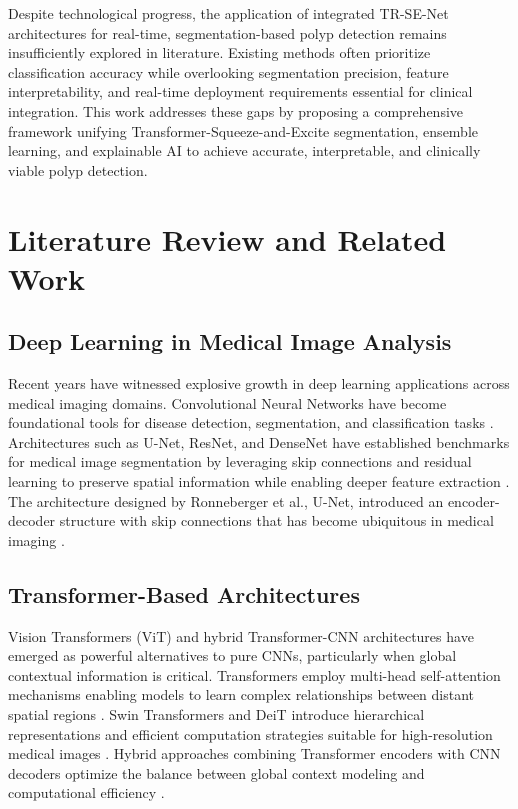 \documentclass[11pt,a4paper]{article}
\begin{document}
Despite technological progress, the application of integrated TR-SE-Net architectures for real-time, segmentation-based polyp detection remains insufficiently explored in literature. Existing methods often prioritize classification accuracy while overlooking segmentation precision, feature interpretability, and real-time deployment requirements essential for clinical integration. This work addresses these gaps by proposing a comprehensive framework unifying Transformer-Squeeze-and-Excite segmentation, ensemble learning, and explainable AI to achieve accurate, interpretable, and clinically viable polyp detection.

\section{Literature Review and Related Work}
\label{sec:literature}

\subsection{Deep Learning in Medical Image Analysis}
Recent years have witnessed explosive growth in deep learning applications across medical imaging domains. Convolutional Neural Networks have become foundational tools for disease detection, segmentation, and classification tasks \cite{ref12}. Architectures such as U-Net, ResNet, and DenseNet have established benchmarks for medical image segmentation by leveraging skip connections and residual learning to preserve spatial information while enabling deeper feature extraction \cite{ref13}. The architecture designed by Ronneberger et al., U-Net, introduced an encoder-decoder structure with skip connections that has become ubiquitous in medical imaging \cite{ref14}.

\subsection{Transformer-Based Architectures}
Vision Transformers (ViT) and hybrid Transformer-CNN architectures have emerged as powerful alternatives to pure CNNs, particularly when global contextual information is critical. Transformers employ multi-head self-attention mechanisms enabling models to learn complex relationships between distant spatial regions \cite{ref15}. Swin Transformers and DeiT introduce hierarchical representations and efficient computation strategies suitable for high-resolution medical images \cite{ref16}. Hybrid approaches combining Transformer encoders with CNN decoders optimize the balance between global context modeling and computational efficiency \cite{ref17}.
\end{document}
